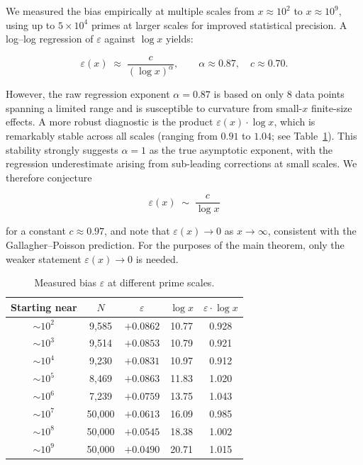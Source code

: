 \documentclass[11pt, a4paper]{amsart}
\theoremstyle{plain}
\theoremstyle{definition}
\begin{document}
We measured the bias empirically at multiple scales from $x \approx 10^2$ to $x \approx 10^9$, using up to $5 \times 10^4$ primes at larger scales
for improved statistical precision. A log--log regression of $\varepsilon$ against $\log x$ yields:

\begin{equation}\label{eq:bias-decay}
\varepsilon(x) \;\approx\; \frac{c}{(\log x)^{\alpha}}, \qquad \alpha \approx 0.87, \quad c \approx 0.70.
\end{equation}

However, the raw regression exponent $\alpha = 0.87$ is based on only $8$ data points spanning a limited
range and is susceptible to curvature from small-$x$ finite-size effects.
A more robust diagnostic is the product $\varepsilon(x) \cdot \log x$, which is remarkably stable across all
scales (ranging from $0.91$ to $1.04$; see Table~\ref{tab:bias}). This stability strongly suggests
$\alpha = 1$ as the true asymptotic exponent, with the regression underestimate arising from sub-leading
corrections at small scales. We therefore conjecture

\begin{equation}\label{eq:bias-asymptotic}
\varepsilon(x) \;\sim\; \frac{c}{\log x}
\end{equation}

for a constant $c \approx 0.97$, and note that $\varepsilon(x) \to 0$ as $x \to \infty$, consistent with the Gallagher--Poisson prediction.
For the purposes of the main theorem, only the weaker statement $\varepsilon(x) \to 0$ is needed.

\begin{table}[ht]
\centering
\caption{Measured bias $\varepsilon$ at different prime scales.}\label{tab:bias}
\begin{tabular}{@{}ccccc@{}}
\toprule
Starting near & $N$ & $\varepsilon$ & $\log x$ & $\varepsilon \cdot \log x$ \\
\midrule
$\sim 10^2$ & 9{,}585 & $+0.0862$ & 10.77 & 0.928 \\
$\sim 10^3$ & 9{,}514 & $+0.0853$ & 10.79 & 0.921 \\
$\sim 10^4$ & 9{,}230 & $+0.0831$ & 10.97 & 0.912 \\
$\sim 10^5$ & 8{,}469 & $+0.0863$ & 11.83 & 1.020 \\
$\sim 10^6$ & 7{,}239 & $+0.0759$ & 13.75 & 1.043 \\
$\sim 10^7$ & 50{,}000 & $+0.0613$ & 16.09 & 0.985 \\
$\sim 10^8$ & 50{,}000 & $+0.0545$ & 18.38 & 1.002 \\
$\sim 10^9$ & 50{,}000 & $+0.0490$ & 20.71 & 1.015 \\
\bottomrule
\end{tabular}
\end{table}
\end{document}
